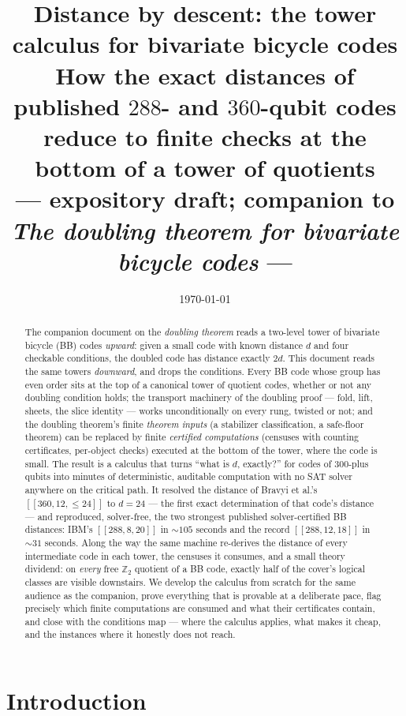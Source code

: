 \documentclass[11pt]{article}
\title{\bfseries Distance by descent: the tower calculus for bivariate
bicycle codes\\[4pt]
\large How the exact distances of published $288$- and $360$-qubit codes
reduce to finite checks at the bottom of a tower of quotients\\[6pt]
\normalsize\normalfont --- expository draft; companion to
\emph{The doubling theorem for bivariate bicycle codes} ---}
\author{}
\date{\today}
\theoremstyle{plain}
\theoremstyle{definition}
\theoremstyle{remark}
\newcommand{\Z}{\mathbb{Z}}
\begin{document}
\maketitle

\begin{abstract}
\noindent
The companion document on the \emph{doubling theorem} reads a two-level
tower of bivariate bicycle (BB) codes \emph{upward}: given a small code
with known distance $d$ and four checkable conditions, the doubled code has
distance exactly $2d$. This document reads the same towers \emph{downward},
and drops the conditions. Every BB code whose group has even order sits at
the top of a canonical tower of quotient codes, whether or not any doubling
condition holds; the transport machinery of the doubling proof --- fold,
lift, sheets, the slice identity --- works unconditionally on every rung,
twisted or not; and the doubling theorem's finite \emph{theorem inputs}
(a stabilizer classification, a safe-floor theorem) can be replaced by
finite \emph{certified computations} (censuses with counting certificates,
per-object checks) executed at the bottom of the tower, where the code is
small. The result is a calculus that turns ``what is $d$, exactly?'' for
codes of $300$-plus qubits into minutes of deterministic, auditable
computation with no SAT solver anywhere on the critical path. It resolved
the distance of Bravyi et al.'s $[[360,12,\leq 24]]$ to $d = 24$ --- the
first exact determination of that code's distance --- and reproduced,
solver-free, the two strongest published solver-certified BB distances:
IBM's $[[288,8,20]]$ in ${\sim}105$ seconds and the record
$[[288,12,18]]$ in ${\sim}31$ seconds. Along the way the same machine
re-derives the distance of every intermediate code in each tower, the
censuses it consumes, and a small theory dividend: on \emph{every} free
$\Z_2$ quotient of a BB code, exactly half of the cover's logical classes
are visible downstairs. We develop the calculus from scratch for the same
audience as the companion, prove everything that is provable at a
deliberate pace, flag precisely which finite computations are consumed and
what their certificates contain, and close with the conditions map ---
where the calculus applies, what makes it cheap, and the instances where
it honestly does not reach.
\end{abstract}

\tableofcontents

\section{Introduction}
\label{sec:intro}
\end{document}
